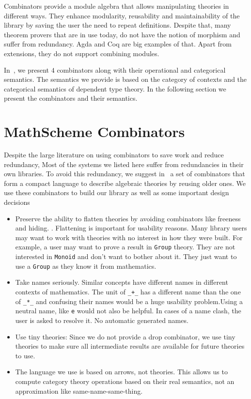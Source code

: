 Combinators provide a module algebra that allows manipulating theories in different ways. They enhance modularity, reusability and maintainability of the library by saving the user the need to repeat definitions. Despite that, 
many theorem provers that are in use today, do not have the notion of morphism and suffer from redundancy. Agda and Coq are big examples of that. Apart from extensions, they do not support combining modules.

In~\cite{carette2018building}, we present $4$ combinators along with their operational and categorical semantics. The semantics we provide is based on the category of contexts and the categorical semantics of dependent type theory. In the following section we present the combinators and their semantics. 

\section{MathScheme Combinators}

Despite the large literature on using combinators to save work and reduce redundancy, Most of the systems we listed here suffer from redundancies in their own libraries. To avoid this redundancy, we suggest in~\cite{carette2018building} a set of combinators that form a compact language to describe algebraic theories by reusing older ones. We use these combinators to build our library as well as some important design decisions 
\begin{itemize}
    \item Preserve the ability to flatten theories by avoiding combinators like freeness and hiding. . Flattening is important for usability reasons. Many library users may want to work with theories with no interest in how they were built. For example, a user may want to prove a result in \verb|Group| theory. They are not interested in \verb|Monoid| and don't want to bother about it. They just want to use a \verb|Group| as they know it from mathematics. 
    \item Take names seriously. Similar concepts have different names in different contexts of mathematics. The unit of \verb|_+_| has a different name than the one of \verb|_*_| and confusing their names would be a huge usability problem.Using a neutral name, like \verb|e| would not also be helpful. In cases of a name clash, the user is asked to resolve it. No automatic generated names. 
    \item Use tiny theories: Since we do not provide a drop combinator, we use tiny theories to make sure all intermediate results are available for future theories to use. 
    \item The language we use is based on arrows, not theories. This allows us to compute category theory operations based on their real semantics, not an approximation like same-name-same-thing. 
\end{itemize}

